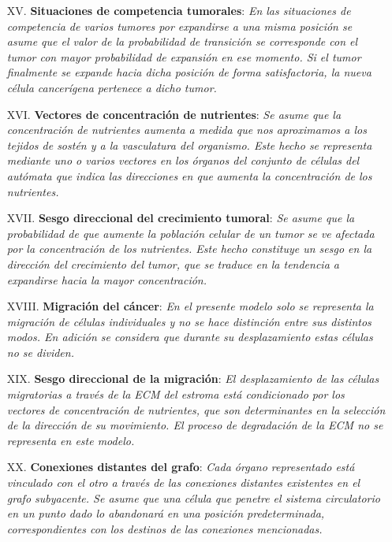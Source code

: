 \begin{enumerate}
\item [{XV.}] \textbf{Situaciones de competencia tumorales}: \emph{En las situaciones de competencia de varios tumores por expandirse a una misma posici\'on se asume que el valor de la probabilidad de transici\'on se corresponde con el tumor con mayor probabilidad de expansi\'on en ese momento. Si el tumor finalmente se expande hacia dicha posici\'on de forma satisfactoria, la nueva c\'elula cancer\'igena pertenece a dicho tumor.} \label{hXV}

\item [{XVI.}] \textbf{Vectores de concentraci\'on de nutrientes}: \emph{Se asume que la concentraci\'on de nutrientes aumenta a medida que nos aproximamos a los tejidos de sost\'en y a la vasculatura del organismo. Este hecho se representa mediante uno o varios vectores en los \'organos del conjunto de c\'elulas del aut\'omata que indica las direcciones en que aumenta la concentraci\'on de los nutrientes.} \label{hXVI}

\item [{XVII.}] \textbf{Sesgo direccional del crecimiento tumoral}: \emph{Se asume que la probabilidad de que aumente la poblaci\'on celular de un tumor se ve afectada por la concentraci\'on de los nutrientes. Este hecho constituye un sesgo en la direcci\'on del crecimiento del tumor, que se traduce en la tendencia a expandirse hacia la mayor concentraci\'on.} \label{hXVII}

\item [{XVIII.}] \textbf{Migraci\'on del c\'ancer}: \emph{En el presente modelo solo se representa la migraci\'on de c\'elulas individuales y no se hace distinci\'on entre sus distintos modos. En adici\'on se considera que durante su desplazamiento estas c\'elulas no se dividen.} \label{hXVIII}

\item [{XIX.}] \textbf{Sesgo direccional de la migraci\'on}: \emph{El desplazamiento de las c\'elulas migratorias a trav\'es de la ECM del estroma est\'a condicionado por los vectores de concentraci\'on de nutrientes, que son determinantes en la selecci\'on de la direcci\'on de su movimiento. El proceso de degradaci\'on de la ECM no se representa en este modelo.} \label{hXIX}

\item [XX.] \textbf{Conexiones distantes del grafo}: \emph{Cada \'organo representado est\'a vinculado con el otro a trav\'es de las conexiones distantes existentes en el grafo subyacente. Se asume que una c\'elula que penetre el sistema circulatorio en un punto dado lo abandonar\'a en una posici\'on predeterminada, correspondientes con los destinos de las conexiones mencionadas.} \label{hXX}


\end{enumerate}

